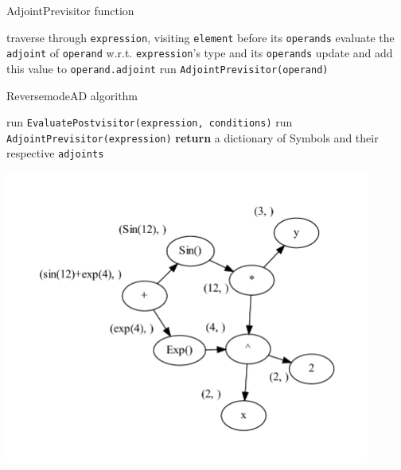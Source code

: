 \documentclass{article}
\begin{document}
\begin{algorithm}
\caption{AdjointPrevisitor function}\label{AdjointPrevisitor}
\begin{algorithmic}[1]
\State traverse through \verb|expression|, visiting \verb|element| before its \verb|operands|
\State evaluate the \verb|adjoint| of \verb|operand| w.r.t. \verb|expression|'s type and its \verb|operands|
\State update and add this value to \verb|operand.adjoint|
\State run \verb|AdjointPrevisitor(operand)|
\EndFor
\EndProcedure
\end{algorithmic}
\end{algorithm}

\begin{algorithm}
\caption{ReversemodeAD algorithm}\label{reverseAD}
\begin{algorithmic}[1]
\State run \verb|EvaluatePostvisitor(expression, conditions)|
\State run \verb|AdjointPrevisitor(expression)|
\State \textbf{return} a dictionary of Symbols and their respective \verb|adjoints|
\EndProcedure
\end{algorithmic}
\end{algorithm}

\begin{center}
    \includegraphics[width=12cm]{images/graph.gv.pdf}
\end{center}
\end{document}

